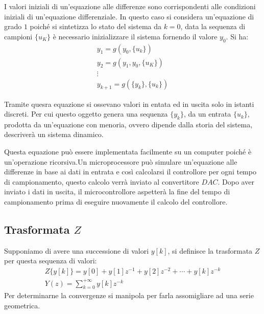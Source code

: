 \documentclass{article}
\numberwithin{equation}{subsection}
\begin{document}
I valori iniziali di un'equazione alle differenze sono corrispondenti alle condizioni iniziali di un'equazione differenziale. In questo caso si considera un'equazione di grado 
$1$ poiché si sintetizza lo stato del sistema da $k=0$, data la sequenza di campioni $\{u_K\}$ è necessario inizializzare il sistema fornendo il valore $y_0$. 
Si ha:
\begin{gather}
    y_1=g(y_0,\{u_k\})\\
    y_2=g(y_1,y_0,\{u_K\})\\
    \vdots\\
    y_{k+1}=g(\{y_k\},\{u_k\})
\end{gather}

Tramite 
quesra equazione si ossevano valori in entata ed in uscita solo in istanti discreti. Per cui questo oggetto genera una sequenza $\{y_k\}$, da un entrata $\{u_k\}$, prodotta 
da un'equazione con menoria, ovvero dipende dalla storia del sistema, descriverà un sistema dinamico. 

\begin{center}\end{center}

Questa equazione può essere implementata facilmente su un computer poiché è un'operazione ricorsiva.Un microprocessore può simulare un'equazione alle differenze in base ai 
dati in entrata e così calcolarsi il controllore per ogni tempo di campionamento, questo calcolo 
verrà inviato al 
convertitore $DAC$. Dopo aver inviato i dati in uscita, il microcontrollore aspetterà la fine del tempo di campionamento prima di eseguire nuovamente il calcolo 
del controllore. 

\subsection{Trasformata $Z$}

Supponiamo di avere una successione di valori $y[k]$, si definisce la trasformata $Z$ per questa sequenza di valori:
\begin{gather}
    Z\{y[k]\}=y[0]+y[1]z^{-1}+y[2]z^{-2}+\cdots+y[k]z^{-k}\\
    Y(z)=\sum_{k=0}^{+\infty}y[k]z^{-k}
\end{gather}
Per determinarne la convergenze si manipola per farla assomigliare ad una serie geometrica. 
\end{document}
